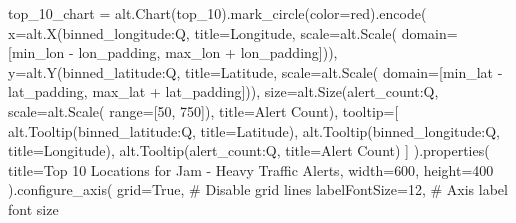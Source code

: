 \documentclass[
  letterpaper,
  DIV=11,
  numbers=noendperiod]{scrartcl}
\newenvironment{Shaded}{\begin{snugshade}}{\end{snugshade}}
\newcommand{\BuiltInTok}[1]{\textcolor[rgb]{0.00,0.23,0.31}{#1}}
\newcommand{\CommentTok}[1]{\textcolor[rgb]{0.37,0.37,0.37}{#1}}
\newcommand{\DecValTok}[1]{\textcolor[rgb]{0.68,0.00,0.00}{#1}}
\newcommand{\NormalTok}[1]{\textcolor[rgb]{0.00,0.23,0.31}{#1}}
\newcommand{\OperatorTok}[1]{\textcolor[rgb]{0.37,0.37,0.37}{#1}}
\newcommand{\StringTok}[1]{\textcolor[rgb]{0.13,0.47,0.30}{#1}}
\newcommand{\VariableTok}[1]{\textcolor[rgb]{0.07,0.07,0.07}{#1}}
\begin{document}
\begin{Shaded}
\begin{Highlighting}[]
\NormalTok{top\_10\_chart }\OperatorTok{=}\NormalTok{ alt.Chart(top\_10).mark\_circle(color}\OperatorTok{=}\StringTok{\textquotesingle{}red\textquotesingle{}}\NormalTok{).encode(}
\NormalTok{    x}\OperatorTok{=}\NormalTok{alt.X(}\StringTok{\textquotesingle{}binned\_longitude:Q\textquotesingle{}}\NormalTok{, title}\OperatorTok{=}\StringTok{\textquotesingle{}Longitude\textquotesingle{}}\NormalTok{, scale}\OperatorTok{=}\NormalTok{alt.Scale(}
\NormalTok{        domain}\OperatorTok{=}\NormalTok{[min\_lon }\OperatorTok{{-}}\NormalTok{ lon\_padding, max\_lon }\OperatorTok{+}\NormalTok{ lon\_padding])),}
\NormalTok{    y}\OperatorTok{=}\NormalTok{alt.Y(}\StringTok{\textquotesingle{}binned\_latitude:Q\textquotesingle{}}\NormalTok{, title}\OperatorTok{=}\StringTok{\textquotesingle{}Latitude\textquotesingle{}}\NormalTok{, scale}\OperatorTok{=}\NormalTok{alt.Scale(}
\NormalTok{        domain}\OperatorTok{=}\NormalTok{[min\_lat }\OperatorTok{{-}}\NormalTok{ lat\_padding, max\_lat }\OperatorTok{+}\NormalTok{ lat\_padding])),}
\NormalTok{    size}\OperatorTok{=}\NormalTok{alt.Size(}\StringTok{\textquotesingle{}alert\_count:Q\textquotesingle{}}\NormalTok{, scale}\OperatorTok{=}\NormalTok{alt.Scale(}
        \BuiltInTok{range}\OperatorTok{=}\NormalTok{[}\DecValTok{50}\NormalTok{, }\DecValTok{750}\NormalTok{]), title}\OperatorTok{=}\StringTok{\textquotesingle{}Alert Count\textquotesingle{}}\NormalTok{),}
\NormalTok{    tooltip}\OperatorTok{=}\NormalTok{[}
\NormalTok{        alt.Tooltip(}\StringTok{\textquotesingle{}binned\_latitude:Q\textquotesingle{}}\NormalTok{, title}\OperatorTok{=}\StringTok{\textquotesingle{}Latitude\textquotesingle{}}\NormalTok{),}
\NormalTok{        alt.Tooltip(}\StringTok{\textquotesingle{}binned\_longitude:Q\textquotesingle{}}\NormalTok{, title}\OperatorTok{=}\StringTok{\textquotesingle{}Longitude\textquotesingle{}}\NormalTok{),}
\NormalTok{        alt.Tooltip(}\StringTok{\textquotesingle{}alert\_count:Q\textquotesingle{}}\NormalTok{, title}\OperatorTok{=}\StringTok{\textquotesingle{}Alert Count\textquotesingle{}}\NormalTok{)}
\NormalTok{    ]}
\NormalTok{).properties(}
\NormalTok{    title}\OperatorTok{=}\StringTok{\textquotesingle{}Top 10 Locations for Jam {-} Heavy Traffic Alerts\textquotesingle{}}\NormalTok{,}
\NormalTok{    width}\OperatorTok{=}\DecValTok{600}\NormalTok{,}
\NormalTok{    height}\OperatorTok{=}\DecValTok{400}
\NormalTok{).configure\_axis(}
\NormalTok{    grid}\OperatorTok{=}\VariableTok{True}\NormalTok{,  }\CommentTok{\# Disable grid lines}
\NormalTok{    labelFontSize}\OperatorTok{=}\DecValTok{12}\NormalTok{,  }\CommentTok{\# Axis label font size}

\end{Highlighting}
\end{Shaded}
\end{document}
